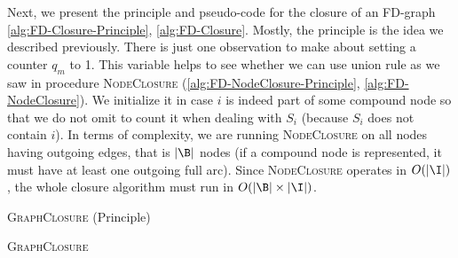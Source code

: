 \vspace{1.2em}

Next, we present the principle and pseudo-code for the closure of an FD-graph
\ref{alg:FD-Closure-Principle}, \ref{alg:FD-Closure}. Mostly, the principle is 
the idea we described previously. There is just one observation to make about 
setting a counter $q_m$ to 1. This variable helps to see whether we can use 
union rule as we saw in procedure \textsc{NodeClosure}
(\ref{alg:FD-NodeClosure-Principle}, \ref{alg:FD-NodeClosure}). We initialize it
in case $i$ is indeed part of some compound node so that we do not omit to count
it when dealing with $S_i$ (because $S_i$ does not contain $i$). In terms of
complexity, we are running \textsc{NodeClosure} on all nodes having outgoing
edges, that is $|\B|$ nodes (if a compound node is represented, it must
have at least one outgoing full arc). Since \textsc{NodeClosure} operates in
$O(|\I|)$, the whole closure algorithm must run in $O(|\B| \times |\I|)$.

\begin{algorithm}
	
	\BlankLine
	\BlankLine
	
	
	\caption{\textsc{GraphClosure} (Principle)}
	\label{alg:FD-Closure-Principle}
\end{algorithm}

\begin{algorithm}
	
	\BlankLine
	\BlankLine
	
	
	\caption{\textsc{GraphClosure}}
	\label{alg:FD-Closure}
\end{algorithm}

